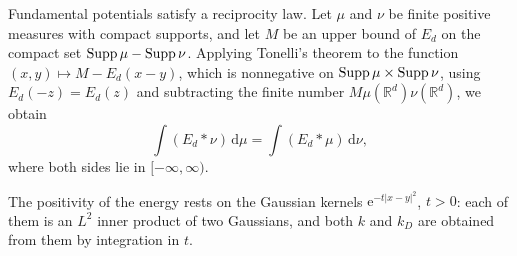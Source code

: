 Fundamental potentials satisfy a reciprocity law. Let $\mu$ and $\nu$ be finite positive measures with compact supports, and let $M$ be an upper bound of $E_d$ on the compact set $\operatorname{Supp}\mu-\operatorname{Supp}\nu$. Applying Tonelli's theorem to the function $(x,y)\mapsto M-E_d(x-y)$, which is nonnegative on $\operatorname{Supp}\mu\times\operatorname{Supp}\nu$, using $E_d(-z)=E_d(z)$ and subtracting the finite number $M\mu(\mathbb R^d)\nu(\mathbb R^d)$, we obtain
\begin{equation}\label{eq:potential-reciprocity}
 \int(E_d*\nu)\,\mathrm d\mu=\int(E_d*\mu)\,\mathrm d\nu,
\end{equation}
where both sides lie in $[-\infty,\infty)$.

The positivity of the energy rests on the Gaussian kernels $\mathrm e^{-t|x-y|^2}$, $t>0$: each of them is an $L^2$ inner product of two Gaussians, and both $k$ and $k_D$ are obtained from them by integration in $t$.

